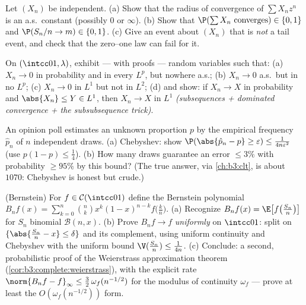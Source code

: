 \begin{exercise}[$\star\star$]\label{exo:b3:probability:5}
Let $(X_n)$ be independent.
(a) Show that the radius of convergence of $\sum X_n z^n$ is
an a.s.\ constant (possibly $0$ or $\infty$).
(b) Show that $\P(\sum X_n \text{ converges}) \in \{0, 1\}$
and $\P(S_n/n \to m) \in \{0,1\}$.
(c) Give an event about $(X_n)$ that is \emph{not} a tail
event, and check that the zero--one law can fail for it.
\end{exercise}

\begin{exercise}[$\star\star$]\label{exo:b3:probability:6}
On $(\intcc01, \lambda)$, exhibit --- with proofs --- random
variables such that:
(a) $X_n \to 0$ in probability and in every $L^p$, but
nowhere a.s.;
(b) $X_n \to 0$ a.s.\ but in no $L^p$;
(c) $X_n \to 0$ in $L^1$ but not in $L^2$;
(d) and show: if $X_n \to X$ in probability and $\abs{X_n}
\leq Y \in L^1$, then $X_n \to X$ in $L^1$
\emph{(subsequences + dominated convergence +
the subsubsequence trick)}.
\end{exercise}

\begin{exercise}[$\star\star$]\label{exo:b3:probability:7}
An opinion poll estimates an unknown proportion $p$ by the
empirical frequency $\hat p_n$ of $n$ independent draws.
(a) Chebyshev: show $\P(\abs{\hat p_n - p} \geq \varepsilon)
\leq \frac1{4n\varepsilon^2}$ (use $p(1-p) \leq \frac14$).
(b) How many draws guarantee an error $\leq 3\%$ with
probability $\geq 95\%$ by this bound? (The true answer,
via \cref{ch:b3:clt}, is about $1070$: Chebyshev is honest
but crude.)
\end{exercise}

\begin{exercise}[$\star\star\star$]\label{exo:b3:probability:8}
(Bernstein) For $f \in \mathcal C(\intcc01)$ define the
Bernstein polynomial $B_nf(x) =
\sum_{k=0}^n\binom nkx^k(1-x)^{n-k}f\bigl(\frac kn\bigr)$.
(a) Recognize $B_nf(x) = \E\bigl[f\bigl(\frac
{S_n}n\bigr)\bigr]$ for $S_n$ binomial $\mathcal B(n, x)$.
(b) Prove $B_nf \to f$ \emph{uniformly} on $\intcc01$: split
on $\{\abs{\frac{S_n}n - x} \leq \delta\}$ and its
complement, using uniform continuity and Chebyshev with the
uniform bound $\V(\frac{S_n}n) \leq \frac1{4n}$.
(c) Conclude: a second, probabilistic proof of the
Weierstrass approximation theorem
(\cref{cor:b3:complete:weierstrass}), with the explicit rate
$\norm{B_nf - f}_\infty \leq \frac32\,\omega_f(n^{-1/2})$
for the modulus of continuity $\omega_f$ --- prove at least
the $O(\omega_f(n^{-1/2}))$ form.
\end{exercise}

